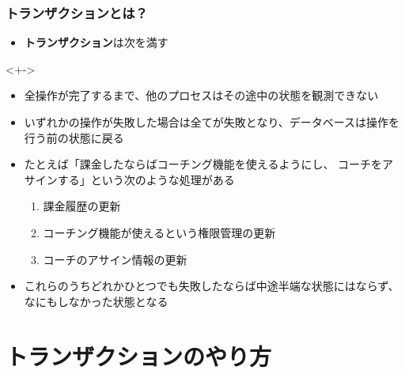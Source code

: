 \begin{frame}
  \frametitle{トランザクションとは？}

  \pause
  \begin{itemize}
    \item<+-> \textbf{トランザクション}は次を満す
  \end{itemize}

  \begin{uncoverenv}<+->
    \begin{shadequote}[r]{}
      \begin{itemize}
        \item 全操作が完了するまで、他のプロセスはその途中の状態を観測できない
        \item いずれかの操作が失敗した場合は全てが失敗となり、データベースは操作を行う前の状態に戻る
      \end{itemize}
    \end{shadequote}
  \end{uncoverenv}

  \begin{itemize}
    \item<+-> たとえば「課金したならばコーチング機能を使えるようにし、
    コーチをアサインする」という次のような処理がある
    \begin{enumerate}
      \item 課金履歴の更新
      \item コーチング機能が使えるという権限管理の更新
      \item コーチのアサイン情報の更新
    \end{enumerate}
    
    \item<+-> これらのうちどれかひとつでも失敗したならば中途半端な状態にはならず、
    なにもしなかった状態となる
  \end{itemize}
\end{frame}

\section{トランザクションのやり方}

